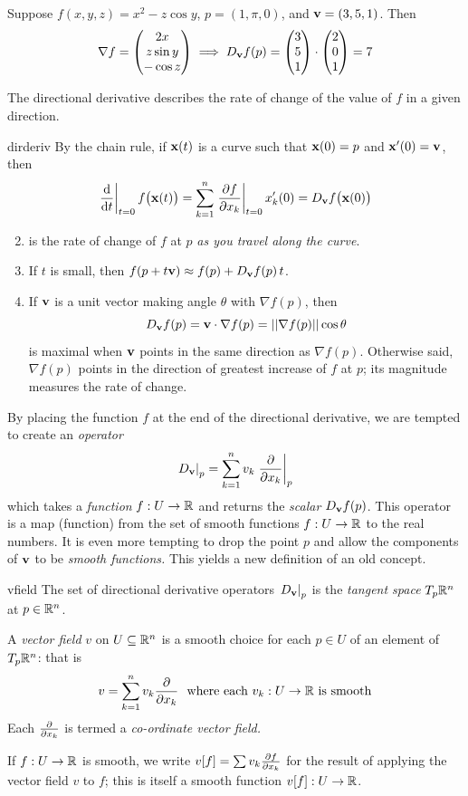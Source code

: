 \begin{example}{}{}
Suppose $f(x,y,z)=x^2-z\cos y$, $p=(1,\pi,0)$, and $\vv=(3,5,1)$. Then
\[\nabla f=\threevec{2x}{z\sin y}{-\cos z} \implies D_\vv f(p)=\threevec 351\cdot\threevec{2}{0}{1} =7\]
\end{example}

The directional derivative describes the rate of change of the value of $f$ in a given direction.

\begin{lemm}{}{dirderiv}
\exstart By the chain rule, if $\vx(t)$ is a curve such that $\vx(0)=p$ and $\vx'(0)=\vv$, then
  \[\diffat t{t=0}f\bigl(\vx(t)\bigr) =\sum_{k=1}^n\partialsat[f]{x_k}{t=0}x'_k(0) =D_\vv f\bigl(\vx(0)\bigr)\]
\begin{enumerate}\setcounter{enumi}{1}
  \item[]	is the rate of change of $f$ at $p$ \emph{as you travel along the curve}.
	\item If $t$ is small, then $f(p+t\vv)\approx f(p)+D_{\vv}f(p)\,t$.
  \item If $\vv$ is a unit vector making angle $\theta$ with $\nabla f(p)$, then
  \[D_{\vv}f(p)=\vv\cdot\nabla f(p)=\Nm{\nabla f(p)}\cos\theta\]
   is maximal when $\vv$ points in the same direction as $\nabla f(p)$. Otherwise said, $\nabla f(p)$ points in the direction of greatest increase of $f$ at $p$; its magnitude measures the rate of change.
\end{enumerate}
\end{lemm}


\goodbreak


By placing the function $f$ at the end of the directional derivative, we are tempted to create an \emph{operator}
\[\at{D_\vv}{p}=\sum_{k=1}^nv_k\partialsat{x_k}{p}\]
which takes a \emph{function} $f:U\to\R$ and returns the \emph{scalar} $D_\vv f(p)$.
This operator is a map (function) from the set of smooth functions $f:U\to\R$ to the real numbers. It is even more tempting to drop the point $p$ and allow the components of $\vv$ to be \emph{smooth functions.} This yields a new definition of an old concept.

\begin{defn}{}{vfield}
The set of directional derivative operators $\at{D_\vv}{p}$ is the \emph{tangent space} $T_p\R^n$ at $p\in\R^n$.\par
A \emph{vector field} $v$ on $U\subseteq\R^n$ is a smooth choice for each $p\in U$ of an element of $T_p\R^n$: that is
\[v=\sum_{k=1}^nv_k\partials{x_k}\ \text{ where each $v_k:U\to\R$ is smooth}\]
Each $\partials{x_k}$ is termed a \emph{co-ordinate vector field.}\par
If $f:U\to\R$ is smooth, we write $v[f]=\sum v_k\partials[f]{x_k}$ for the result of applying the vector field $v$ to $f$; this is itself a smooth function $v[f]:U\to\R$.
\end{defn}

